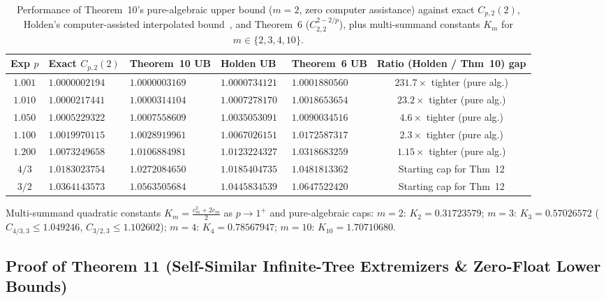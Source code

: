 \documentclass[10pt,letterpaper]{article}
\begin{document}
\begin{table}[htbp]
\centering
\caption{\small Performance of Theorem~10's pure-algebraic upper bound ($m = 2$, zero computer assistance) against exact $C_{p,2}(2)$, Holden's computer-assisted interpolated bound~\cite{Holden2026b}, and Theorem~6 ($C_{2,2}^{2-2/p}$), plus multi-summand constants $K_m$ for $m \in \{2,3,4,10\}$.}
\vspace{3pt}
\footnotesize
\begin{tabular}{@{}c l l l l c@{}}
\toprule
\textbf{Exp $p$} & \textbf{Exact $C_{p,2}(2)$} & \textbf{Theorem~10 UB} & \textbf{Holden UB~\cite{Holden2026b}} & \textbf{Theorem~6 UB} & \textbf{Ratio (Holden / Thm~10) gap} \\
\midrule
$1.001$ & $1.0000002194$ & $\mathbf{1.0000003169}$ & $1.0000734121$ & $1.0001880560$ & $\mathbf{231.7\times}$ tighter (pure alg.) \\
$1.010$ & $1.0000217441$ & $\mathbf{1.0000314104}$ & $1.0007278170$ & $1.0018653654$ & $\mathbf{23.2\times}$ tighter (pure alg.) \\
$1.050$ & $1.0005229322$ & $\mathbf{1.0007558609}$ & $1.0035053091$ & $1.0090034516$ & $\mathbf{4.6\times}$ tighter (pure alg.) \\
$1.100$ & $1.0019970115$ & $\mathbf{1.0028919961}$ & $1.0067026151$ & $1.0172587317$ & $\mathbf{2.3\times}$ tighter (pure alg.) \\
$1.200$ & $1.0073249658$ & $\mathbf{1.0106884981}$ & $1.0123224327$ & $1.0318683259$ & $\mathbf{1.15\times}$ tighter (pure alg.) \\
$4/3$   & $1.0183023754$ & $1.0272084650$          & $1.0185404735$ & $1.0481813362$ & Starting cap for Thm~12 \\
$3/2$   & $1.0364143573$ & $1.0563505684$          & $1.0445834539$ & $1.0647522420$ & Starting cap for Thm~12 \\
\bottomrule
\end{tabular}
\vspace{4pt}
\par\parbox{0.96\textwidth}{\footnotesize Multi-summand quadratic constants $K_m = \frac{c_m^2+2c_m}{2}$ as $p \to 1^+$ and pure-algebraic caps: $m = 2$: $K_2 = 0.31723579$; $m = 3$: $K_3 = 0.57026572$ ($C_{4/3,3} \le 1.049246$, $C_{3/2,3} \le 1.102602$); $m = 4$: $K_4 = 0.78567947$; $m = 10$: $K_{10} = 1.70710680$.}
\label{tab:thm10}
\end{table}

\subsection{Proof of Theorem 11 (Self-Similar Infinite-Tree Extremizers \& Zero-Float Lower Bounds)}
\end{document}
